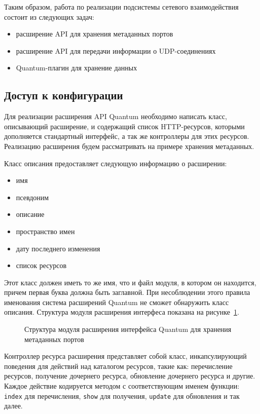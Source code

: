 Таким образом, работа по реализации подсистемы сетевого взаимодействия состоит из следующих 
задач:
\begin{itemize}
    \item расширение API для хранения метаданных портов
    \item расширение API для передачи информации о UDP-соединениях
    \item Quantum-плагин для хранение данных
\end{itemize}
 
\subsection{Доступ к конфигурации} 
 
Для реализации расширения API Quantum необходимо написать класс, описывающий
расширение, и содержащий список HTTP-ресурсов, которыми дополняется стандартный интерфейс,
а так же контроллеры для этих ресурсов. Реализацию расширения будем рассматривать
на примере хранения метаданных.

Класс описания предоставляет следующую информацию о расширении:
\begin{itemize}
    \item имя
    \item псевдоним
    \item описание
    \item пространство имен
    \item дату последнего изменения
    \item список ресурсов
\end{itemize}
Этот класс должен иметь то же имя, что и файл модуля, в котором он находится, причем
первая буква должна быть заглавной. При несоблюдении этого правила именования система
расширений Quantum не сможет обнаружить класс описания.
Структура модуля расширения интерфеса показана на рисунке~\ref{fig:metadata-api-uml}.
\begin{figure}
  \centering
  {\footnotesize\tt}
  \caption{Структура модуля расширения интерфейса Quantum для хранения метаданных портов}
  \label{fig:metadata-api-uml}
\end{figure} 

Контроллер ресурса расширения представляет собой класс, инкапсулирующий поведения для действий над каталогом ресурсов, такие как: перечисление ресурсов, получение дочернего
ресурса, обновление дочернего ресурса и другие. Каждое действие кодируется методом
с соответствующим именем функции: \verb`index` для перечисления, \verb`show` для получения,
\verb`update` для обновления и так далее.

